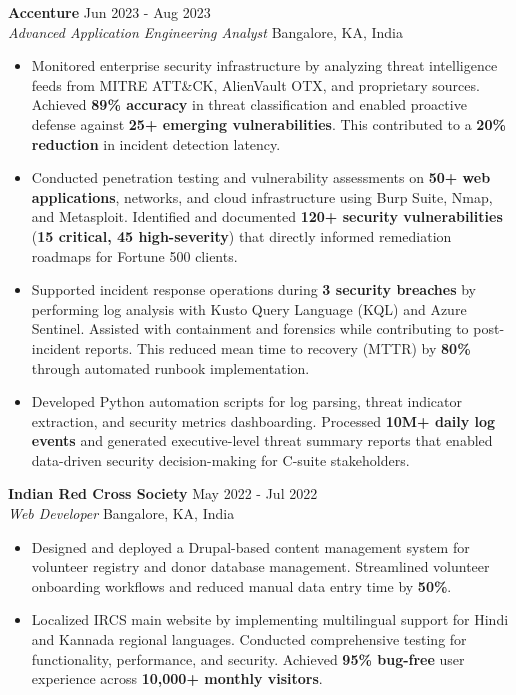 \documentclass[11pt,letterpaper]{article}
\newcommand{\cventry}[4]{
    \noindent\textbf{#1} \hfill #2\\
    \textit{#3} \hfill #4\\[4pt]
}
\begin{document}
\cventry{Accenture}{Jun 2023 - Aug 2023}{Advanced Application Engineering Analyst}{Bangalore, KA, India}
\begin{itemize}[leftmargin=16pt, noitemsep, topsep=2pt]
    \item Monitored enterprise security infrastructure by analyzing threat intelligence feeds from MITRE ATT\&CK, AlienVault OTX, and proprietary sources. Achieved \textbf{89\% accuracy} in threat classification and enabled proactive defense against \textbf{25+ emerging vulnerabilities}. This contributed to a \textbf{20\% reduction} in incident detection latency.
    
    \item Conducted penetration testing and vulnerability assessments on \textbf{50+ web applications}, networks, and cloud infrastructure using Burp Suite, Nmap, and Metasploit. Identified and documented \textbf{120+ security vulnerabilities} (\textbf{15 critical, 45 high-severity}) that directly informed remediation roadmaps for Fortune 500 clients.
    
    \item Supported incident response operations during \textbf{3 security breaches} by performing log analysis with Kusto Query Language (KQL) and Azure Sentinel. Assisted with containment and forensics while contributing to post-incident reports. This reduced mean time to recovery (MTTR) by \textbf{80\%} through automated runbook implementation.
    
    \item Developed Python automation scripts for log parsing, threat indicator extraction, and security metrics dashboarding. Processed \textbf{10M+ daily log events} and generated executive-level threat summary reports that enabled data-driven security decision-making for C-suite stakeholders.
\end{itemize}

\cventry{Indian Red Cross Society}{May 2022 - Jul 2022}{Web Developer}{Bangalore, KA, India}
\begin{itemize}[leftmargin=16pt, noitemsep, topsep=2pt]
    \item Designed and deployed a Drupal-based content management system for volunteer registry and donor database management. Streamlined volunteer onboarding workflows and reduced manual data entry time by \textbf{50\%}.
    
    \item Localized IRCS main website by implementing multilingual support for Hindi and Kannada regional languages. Conducted comprehensive testing for functionality, performance, and security. Achieved \textbf{95\% bug-free} user experience across \textbf{10,000+ monthly visitors}.
\end{itemize}
\end{document}
